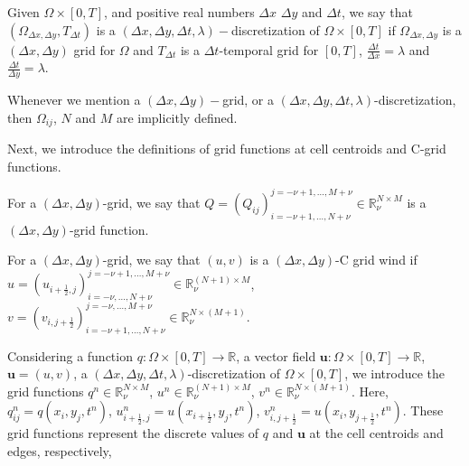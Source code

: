 \begin{definition}
	\label{chp2-def-dxdytimegrid}
	Given $\Omega \times [0,T]$,
	and positive real numbers $\Delta x$ $\Delta y$ and $\Delta t$, we say that
	$(\Omega_{\Delta x, \Delta y}, {T}_{\Delta t})$
	is a $(\Delta x,\Delta y,\Delta t, \lambda)-$discretization of $\Omega \times [0,T]$ if
	$\Omega_{\Delta x, \Delta y}$ is a $(\Delta x,\Delta y)$
	grid for $\Omega$ and ${T}_{\Delta t}$ is a $\Delta t$-temporal
	grid for $[0,T]$, $\frac{\Delta t}{\Delta x} = \lambda$
	and  $\frac{\Delta t}{\Delta y} = \lambda$.
\end{definition}
\begin{remark}
	Whenever we mention a $(\Delta x,\Delta y)-$grid, or a $(\Delta x,\Delta y,\Delta t, \lambda)$-discretization,
	then $\Omega_{ij}$, $N$ and $M$ are implicitly defined.
\end{remark}
Next, we introduce the definitions of grid functions at cell centroids and C-grid functions. 
\begin{definition}
	\label{chp2-rmk-2d-gridfunction1}
	For a $(\Delta x,\Delta y)$-grid, we say that $Q = (Q_{ij})_{i=-\nu+1,\ldots,N+\nu}^{j=-\nu+1,\ldots,M+\nu} \in \mathbb{R}^{N\times M}_{\nu}$ is a 
	$(\Delta x,\Delta y)$-grid function.
\end{definition}
\begin{definition}
	\label{chp2-rmk-2d-gridfunction2}
	For a $(\Delta x,\Delta y)$-grid, we say that $(u,v)$ is a $(\Delta x,\Delta y)$-C grid wind if 
	$u = (u_{i+\frac{1}{2},j})_{i=-\nu,\ldots,N+\nu}^{j=-\nu+1,\ldots,M+\nu} \in \mathbb{R}^{(N+1) \times M}_{\nu}$, 
    $v = (v_{i,j+\frac{1}{2}})_{i=-\nu+1,\ldots,N+\nu}^{j=-\nu,\ldots,M+\nu} \in \mathbb{R}^{N \times (M+1)}_{\nu}$.
\end{definition}
Considering a function $q:\Omega\times[0,T] \to \mathbb{R}$,
a vector field $\boldsymbol{u}:\Omega\times[0,T] \to \mathbb{R}$, $\boldsymbol{u}=(u,v)$,
a $(\Delta x,\Delta y, \Delta t, \lambda)$-discretization
of $\Omega\times[0,T]$, we introduce the grid functions $q^n \in \mathbb{R}^{N\times M}_{\nu}$,
$u^n \in \mathbb{R}^{(N+1)\times M}_{\nu}$, $v^n \in \mathbb{R}^{N\times (M+1)}_{\nu}$. 
Here, ${q}^n_{ij} = {q}(x_i, y_j,t^{n})$, $u^n_{i+\frac{1}{2},j} = u(x_{i+\frac{1}{2}},y_j, t^n)$,
$v^n_{i,j+\frac{1}{2}} = u(x_i,y_{j+\frac{1}{2}}, t^n)$.
These grid functions represent the discrete values of $q$ and $\boldsymbol{u}$
at the cell centroids and edges, respectively,

